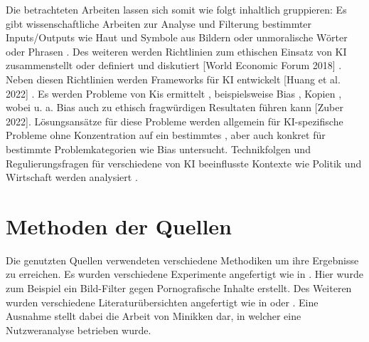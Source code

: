Die betrachteten Arbeiten lassen sich somit wie folgt inhaltlich gruppieren: Es gibt wissenschaftliche Arbeiten zur Analyse und Filterung
bestimmter Inputs/Outputs wie Haut und Symbole aus Bildern \cite{Zheng} oder unmoralische Wörter oder Phrasen \cite{Shah}. Des weiteren 
werden Richtlinien zum ethischen Einsatz von KI zusammenstellt oder definiert und diskutiert \cite{Ayling} \cite{Srinivasan} 
\cite{Jameel} \cite{Hagendorff} \cite{Jobin} \cite{Unity} \cite{EUCommision}[World Economic Forum 2018] \cite{Mueller}.
Neben diesen Richtlinien werden Frameworks für KI entwickelt [Huang et al. 2022] \cite{Mueller}. Es werden Probleme von Kis ermittelt \cite{Ayling}, 
beispielsweise Bias \cite{Salminen} \cite{Jameel}, Kopien \cite{Somepalli}, wobei u. a. Bias auch zu ethisch 
fragwürdigen Resultaten führen kann [Zuber 2022]. Lösungsansätze für diese Probleme werden allgemein für KI-spezifische Probleme ohne 
Konzentration auf ein bestimmtes \cite{Ayling} \cite{Avelar}, aber auch konkret für bestimmte Problemkategorien wie Bias \cite{Srinivasan}
\cite{Jameel}untersucht. Technikfolgen und Regulierungsfragen für verschiedene von KI beeinflusste Kontexte wie Politik und Wirtschaft
werden analysiert \cite{Pawelec}.

\section{Methoden der Quellen}
Die genutzten Quellen verwendeten verschiedene Methodiken um ihre Ergebnisse zu erreichen. Es wurden verschiedene Experimente angefertigt wie in \cite{Zheng}. Hier wurde zum Beispiel ein Bild-Filter gegen Pornografische Inhalte erstellt.
Des Weiteren wurden verschiedene Literaturübersichten angefertigt wie in \cite{Srinivasan} oder \cite{Jobin}. Eine Ausnahme stellt dabei die Arbeit von Minikken \cite{Minkkinen} dar, in welcher eine Nutzweranalyse betrieben wurde. 